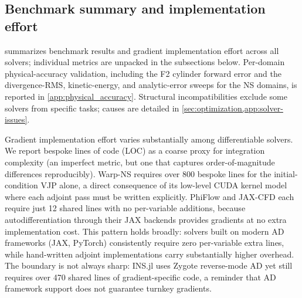 \documentclass{article}
\begin{document}
\subsection{Benchmark summary and implementation effort}
\label{sec:baselines}

 summarizes benchmark results and gradient implementation
effort across all solvers; individual metrics are unpacked in the
subsections below.
Per-domain physical-accuracy validation, including the F2 cylinder forward
error and the divergence-RMS, kinetic-energy, and analytic-error sweeps for
the NS domains, is reported in \cref{app:physical_accuracy}.
Structural incompatibilities exclude some solvers from specific tasks;
causes are detailed in \cref{sec:optimization,app:solver-issues}.

Gradient implementation effort varies substantially among differentiable solvers.
We report bespoke lines of code (LOC) as a coarse proxy for integration
complexity (an imperfect metric, but one that captures order-of-magnitude
differences reproducibly).
Warp-NS requires over 800 bespoke lines for the initial-condition VJP alone,
a direct consequence of its low-level CUDA kernel model where each adjoint pass
must be written explicitly.
PhiFlow and JAX-CFD each require just 12 shared lines with no per-variable
additions, because autodifferentiation through their JAX backends provides
gradients at no extra implementation cost.
This pattern holds broadly: solvers built on modern AD frameworks (JAX,
PyTorch) consistently require zero per-variable extra lines, while hand-written
adjoint implementations carry substantially higher overhead.
The boundary is not always sharp: INS.jl uses Zygote reverse-mode AD yet
still requires over 470 shared lines of gradient-specific code, a reminder
that AD framework support does not guarantee turnkey gradients.
\end{document}
